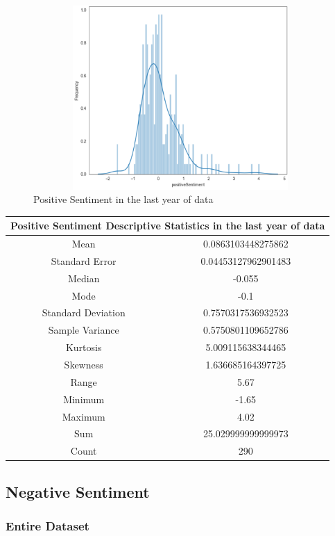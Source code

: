 \begin{figure}[h!]
\centering
\includegraphics[width=15cm,height=7cm,keepaspectratio]{resultsEvaluation/positiveDesc1.png}
\caption{Positive Sentiment in the last year of data}
\label{fig:appendix_positiveDesc1}
\end{figure}
\begin{center}
\begin{tabular}{ c c }
\hline
\multicolumn{2}{|c|}{Positive Sentiment Descriptive Statistics in the last year of data} \\
\hline
Mean & 0.0863103448275862 \\
Standard Error & 0.04453127962901483 \\
Median & -0.055 \\
Mode & -0.1 \\
Standard Deviation & 0.7570317536932523 \\
Sample Variance & 0.5750801109652786 \\
Kurtosis & 5.009115638344465 \\
Skewness & 1.636685164397725 \\
Range & 5.67 \\
Minimum & -1.65 \\
Maximum & 4.02 \\
Sum & 25.029999999999973 \\
Count & 290
\end{tabular}
\end{center}

\subsection{Negative Sentiment}

\subsubsection{Entire Dataset}


